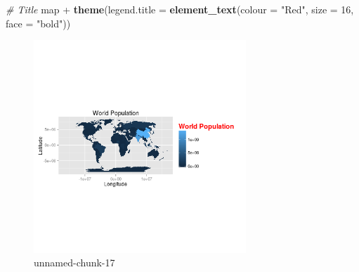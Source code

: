 \documentclass[]{article}
\newenvironment{Shaded}{}{}
\newcommand{\KeywordTok}[1]{\textcolor[rgb]{0.00,0.44,0.13}{\textbf{{#1}}}}
\newcommand{\DataTypeTok}[1]{\textcolor[rgb]{0.56,0.13,0.00}{{#1}}}
\newcommand{\DecValTok}[1]{\textcolor[rgb]{0.25,0.63,0.44}{{#1}}}
\newcommand{\StringTok}[1]{\textcolor[rgb]{0.25,0.44,0.63}{{#1}}}
\newcommand{\CommentTok}[1]{\textcolor[rgb]{0.38,0.63,0.69}{\textit{{#1}}}}
\newcommand{\NormalTok}[1]{{#1}}
\let\Oldincludegraphics\includegraphics
\renewcommand{\includegraphics}[1]{\Oldincludegraphics[width=8cm]{#1}}
\begin{document}
\begin{Shaded}
\begin{Highlighting}[]

\CommentTok{# Title}
\NormalTok{map + }\KeywordTok{theme}\NormalTok{(}\DataTypeTok{legend.title =} \KeywordTok{element_text}\NormalTok{(}\DataTypeTok{colour =} \StringTok{"Red"}\NormalTok{, }\DataTypeTok{size =} \DecValTok{16}\NormalTok{, }\DataTypeTok{face =} \StringTok{"bold"}\NormalTok{))}
\end{Highlighting}
\end{Shaded}
\begin{figure}[htbp]
\centering
\includegraphics{figure/unnamed-chunk-172.png}
\caption{unnamed-chunk-17}
\end{figure}
\end{document}
